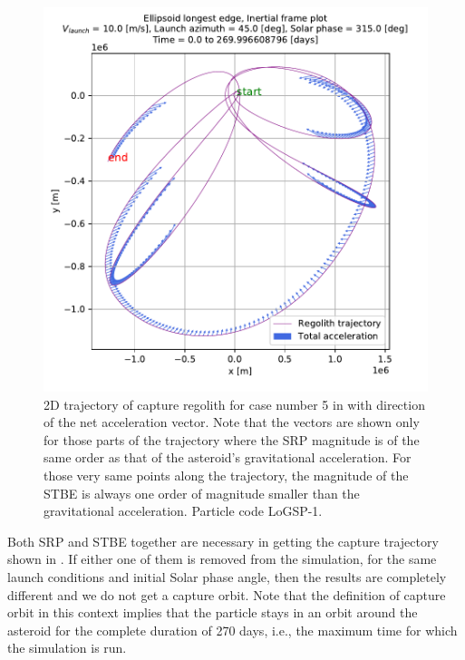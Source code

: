 \FloatBarrier
\begin{figure}[htb]
\centering
\captionsetup{justification=centering}
\includegraphics[width=\linewidth, height=0.4\textheight, keepaspectratio=true]{longest_edge_perturbations/3.2Density_1cmSize/10ms_45Azimuth_315SolarPhase/totalAcceleration.pdf}
\caption{2D trajectory of capture regolith for case number 5 in  with direction of the net acceleration vector. Note that the vectors are shown only for those parts of the trajectory where the \gls{SRP} magnitude is of the same order as that of the asteroid's gravitational acceleration. For those very same points along the trajectory, the magnitude of the \gls{STBE} is always one order of magnitude smaller than the gravitational acceleration. Particle code LoGSP-1.}
\label{fig:LoGSP_1_capture_case_5_2d_totalAccelerationVector_inertialFrame}
\end{figure}
\FloatBarrier
Both \gls{SRP} and \gls{STBE} together are necessary in getting the capture trajectory shown in . If either one of them is removed from the simulation, for the same launch conditions and initial Solar phase angle, then the results are completely different and we do not get a capture orbit. Note that the definition of capture orbit in this context implies that the particle stays in an orbit around the asteroid for the complete duration of 270 days, i.e., the maximum time for which the simulation is run.

